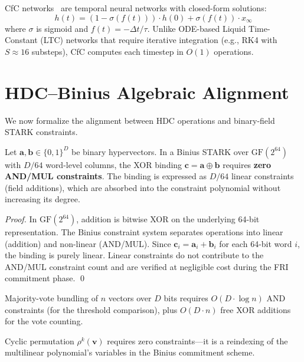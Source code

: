 \documentclass[11pt,twocolumn]{article}
\begin{document}
CfC networks~\cite{hasani2022cfc} are temporal neural networks with closed-form solutions:
$$h(t) = (1 - \sigma(f(t))) \cdot h(0) + \sigma(f(t)) \cdot x_\infty$$
where $\sigma$ is sigmoid and $f(t) = -\Delta t / \tau$. Unlike ODE-based Liquid Time-Constant (LTC) networks that require iterative integration (e.g., RK4 with $S \approx 16$ substeps), CfC computes each timestep in $O(1)$ operations.

\section{HDC--Binius Algebraic Alignment}
\label{sec:alignment}

We now formalize the alignment between HDC operations and binary-field STARK constraints.

\begin{theorem}
Let $\mathbf{a}, \mathbf{b} \in \{0,1\}^D$ be binary hypervectors. In a Binius STARK over $\mathrm{GF}(2^{64})$ with $D/64$ word-level columns, the XOR binding $\mathbf{c} = \mathbf{a} \oplus \mathbf{b}$ requires \textbf{zero AND/MUL constraints}. The binding is expressed as $D/64$ linear constraints (field additions), which are absorbed into the constraint polynomial without increasing its degree.
\end{theorem}

\begin{proof}
In $\mathrm{GF}(2^{64})$, addition is bitwise XOR on the underlying 64-bit representation. The Binius constraint system separates operations into linear (addition) and non-linear (AND/MUL). Since $\mathbf{c}_i = \mathbf{a}_i + \mathbf{b}_i$ for each 64-bit word $i$, the binding is purely linear. Linear constraints do not contribute to the AND/MUL constraint count and are verified at negligible cost during the FRI commitment phase. \qed
\end{proof}

\begin{corollary}
Majority-vote bundling of $n$ vectors over $D$ bits requires $O(D \cdot \log n)$ AND constraints (for the threshold comparison), plus $O(D \cdot n)$ free XOR additions for the vote counting.
\end{corollary}

\begin{corollary}
Cyclic permutation $\rho^k(\mathbf{v})$ requires zero constraints---it is a reindexing of the multilinear polynomial's variables in the Binius commitment scheme.
\end{corollary}
\end{document}
